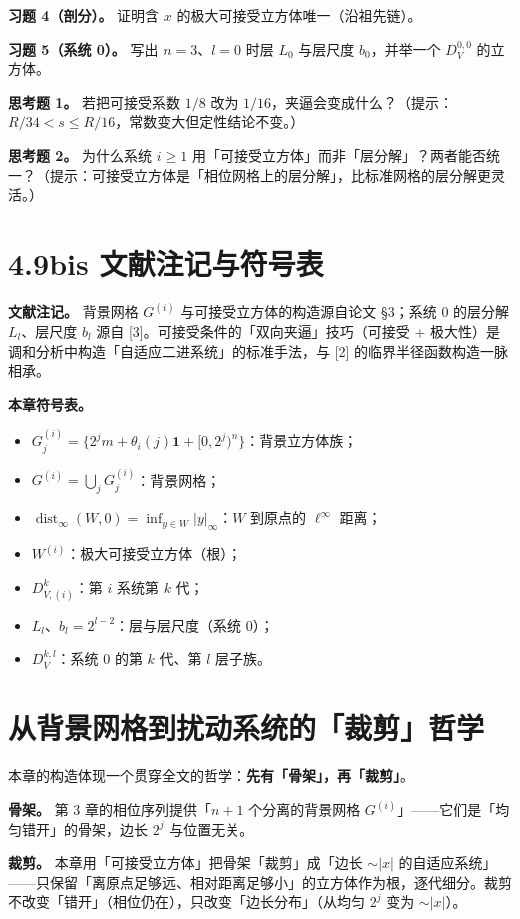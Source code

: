 \documentclass[a4paper,11pt,openany]{ctexbook}
\numberwithin{equation}{chapter}
\numberwithin{figure}{chapter}
\numberwithin{table}{chapter}
\begin{document}
\textbf{习题 4（剖分）。} 证明含 $x$ 的极大可接受立方体唯一（沿祖先链）。

\textbf{习题 5（系统 0）。} 写出 $n=3$、$l=0$ 时层 $L_0$ 与层尺度 $b_0$，并举一个 $D_V^{0,0}$ 的立方体。

\textbf{思考题 1。} 若把可接受系数 $1/8$ 改为 $1/16$，夹逼会变成什么？（提示：$R/34<s\le R/16$，常数变大但定性结论不变。）

\textbf{思考题 2。} 为什么系统 $i\ge1$ 用「可接受立方体」而非「层分解」？两者能否统一？（提示：可接受立方体是「相位网格上的层分解」，比标准网格的层分解更灵活。）

\section{4.9bis 文献注记与符号表}

\textbf{文献注记。} 背景网格 $G^{(i)}$ 与可接受立方体的构造源自论文 §3；系统 0 的层分解 $L_l$、层尺度 $b_l$ 源自 [3]。可接受条件的「双向夹逼」技巧（可接受 + 极大性）是调和分析中构造「自适应二进系统」的标准手法，与 [2] 的临界半径函数构造一脉相承。

\textbf{本章符号表。}

\begin{itemize}
\item $G_j^{(i)}=\{2^j m+\theta_i(j)\mathbf1+[0,2^j)^n\}$：背景立方体族；
\item $G^{(i)}=\bigcup_jG_j^{(i)}$：背景网格；
\item $\operatorname{dist}_\infty(W,0)=\inf_{y\in W}|y|_\infty$：$W$ 到原点的 $\ell^\infty$ 距离；
\item $W^{(i)}$：极大可接受立方体（根）；
\item $D_{V,(i)}^k$：第 $i$ 系统第 $k$ 代；
\item $L_l$、$b_l=2^{l-2}$：层与层尺度（系统 0）；
\item $D_V^{k,l}$：系统 0 的第 $k$ 代、第 $l$ 层子族。
\end{itemize}

\section{从背景网格到扰动系统的「裁剪」哲学}

本章的构造体现一个贯穿全文的哲学：\textbf{先有「骨架」，再「裁剪」}。

\textbf{骨架。} 第 3 章的相位序列提供「$n+1$ 个分离的背景网格 $G^{(i)}$」——它们是「均匀错开」的骨架，边长 $2^j$ 与位置无关。

\textbf{裁剪。} 本章用「可接受立方体」把骨架「裁剪」成「边长 $\sim|x|$ 的自适应系统」——只保留「离原点足够远、相对距离足够小」的立方体作为根，逐代细分。裁剪不改变「错开」（相位仍在），只改变「边长分布」（从均匀 $2^j$ 变为 $\sim|x|$）。
\end{document}
